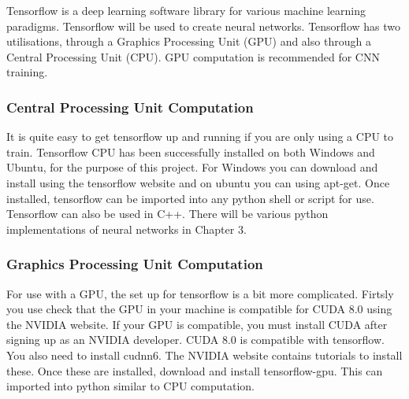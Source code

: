 Tensorflow is a deep learning software library for various machine learning paradigms. Tensorflow will be used to create neural networks.
Tensorflow has two utilisations, through a Graphics Processing Unit (GPU) and
also through a Central Processing Unit (CPU).
GPU computation is recommended for CNN training. 

\subsubsection*{Central Processing Unit Computation}
It is quite easy to get tensorflow up and running if you are only using a CPU to
train. Tensorflow CPU has been successfully installed on both Windows and Ubuntu, for the purpose of this project.
For Windows you can download and install using the tensorflow website and on ubuntu you can
using apt-get. Once installed, tensorflow can be imported into any python shell
or script for use. Tensorflow can also be used in C++. There will be various
python implementations of neural networks in Chapter 3.

\subsubsection*{Graphics Processing Unit Computation}
For use with a GPU, the set up for tensorflow is a bit more complicated. Firtsly
you use check that the GPU in your machine is compatible for CUDA 8.0 using the
NVIDIA website. If your GPU is compatible, you must install CUDA after signing
up as an NVIDIA developer. CUDA 8.0 is compatible with tensorflow. You also need
to install cudnn6. The NVIDIA website contains tutorials to install these. Once
these are installed, download and install tensorflow-gpu. This can imported into
python similar to CPU computation.
